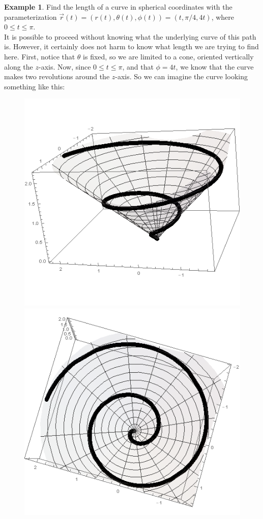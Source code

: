 \documentclass{book}
\theoremstyle{definition}
\newtheorem{exmp}{Example}[section]
\begin{document}
\begin{exmp}
Find the length of a curve in spherical coordinates with the parameterization $\vec{r}(t) = (r(t), \theta(t),\phi(t)) = (t,\pi/4,4t)$, where $0\leq t \leq \pi$.\\

It is possible to proceed without knowing what the underlying curve of this path is. However, it certainly does not harm to know what length we are trying to find here. First, notice that $\theta$ is fixed, so we are limited to a cone, oriented vertically along the $z$-axis. Now, since $0 \leq t \leq \pi$, and that $\phi = 4t$, we know that the curve makes two revolutions around the $z$-axis. So we can imagine the curve looking something like this:
\begin{figure}[h!]
	\centering
	\includegraphics[scale=0.35]{gr-fig-9a.png}
	\includegraphics[scale=0.35]{gr-fig-9b.png}

\end{figure}
\end{exmp}
\end{document}
